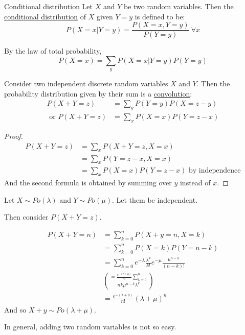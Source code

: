 \documentclass[../Main.tex]{subfiles}
\begin{document}
\begin{definition}{Conditional distribution}
    Let $X$ and $Y$ be two random variables. Then the \underline{conditional distribution} of $X$ given $Y = y$ is defined to be:
    \begin{equation*}
        P(X = x | Y = y) = \frac{P(X = x, Y = y)}{P(Y = y)}~\forall x
    \end{equation*}
\end{definition}
By the law of total probability,
\begin{equation*}
    P(X = x) = \sum_y P(X = x | Y = y) P(Y = y)
\end{equation*}
\begin{proposition}[Convolutions]
    Consider two independent discrete random variables $X$ and $Y$. Then the probability distribution given by their sum is a \underline{convolution}:
    \begin{align*}
        P(X + Y = z) &= \sum_y P(Y = y) P(X = z - y) \\
        \text{ or } P(X + Y = z) &= \sum_x P(X = x) P(Y = z - x)
    \end{align*}
\end{proposition}
\begin{proof}
    \begin{align*}
        P(X + Y = z) &= \sum_x P(X + Y = z, X = x) \\
        &= \sum_x P(Y = z - x, X = x) \\
        &= \sum_x P(X = x) P(Y = z - x) \text{ by independence}
    \end{align*}
    And the second formula is obtained by summing over $y$ instead of $x$.
\end{proof}
\begin{example}
    Let $X \sim Po(\lambda)$ and $Y \sim Po(\mu)$. Let them be independent.\par
    Then consider $P(X + Y = z)$.\par
    \begin{align*}
        P(X + Y = n) &= \sum_{k = 0}^n P(X + y = n, X = k) \\
        &= \sum_{k = 0}^n P(X = k) P(Y = n-k) \\
        &= \sum_{k = 0}^n e^{-\lambda} \frac{\lambda^k}{k!} e^{-\mu} \frac{\mu^{n-k}}{(n-k)!} \\
        &= \frac{e^{-(\lambda + \mu)}}{n!} \sum_{k = 0}^n \choose{n}{k} \mu^{n-k} \lambda^k \\
        &= \frac{e^{-(\lambda + \mu)}}{n!} (\lambda + \mu)^n
    \end{align*}
    And so $X + y \sim Po(\lambda + \mu)$.\par
    In general, adding two random variables is not so easy.
\end{example}
\end{document}
